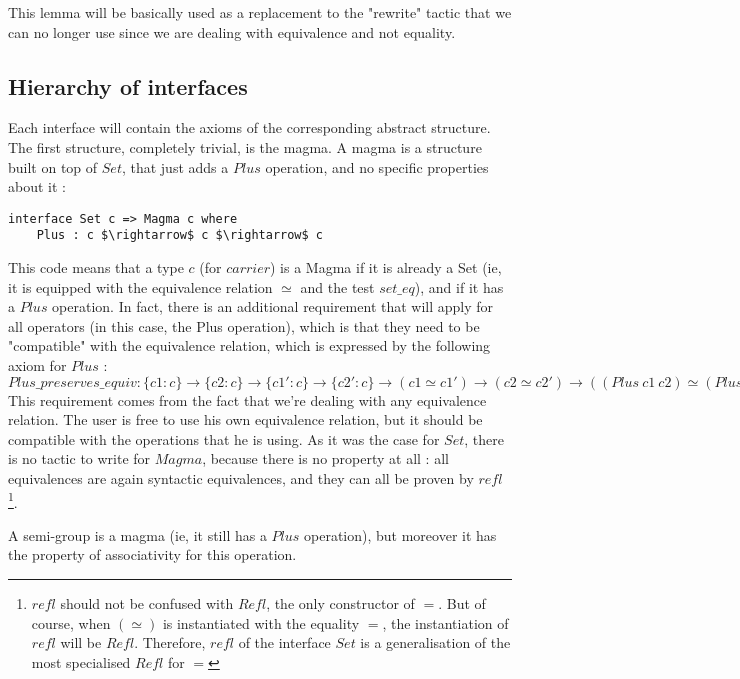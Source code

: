 This lemma will be basically used as a replacement to the "rewrite" tactic that we can no longer use since we are dealing with equivalence and not equality.

		\subsection{Hierarchy of interfaces}

Each interface will contain the axioms of the corresponding abstract structure. The first structure, completely trivial, is the magma. A magma is a structure built on top of $Set$, that just adds a $Plus$ operation, and no specific properties about it :

\begin{lstlisting}
interface Set c => Magma c where
    Plus : c $\rightarrow$ c $\rightarrow$ c
\end{lstlisting}

This code means that a type $c$ (for $carrier$) is a Magma if it is already a Set (ie, it is equipped with the equivalence relation $\simeq$ and the test $set\_eq$), and if it has a $Plus$ operation.
In fact, there is an additional requirement that will apply for all operators (in this case, the Plus operation), which is that they need to be "compatible" with the equivalence relation, which is expressed by the following axiom for $Plus$ : \\ $Plus\_preserves\_equiv : \{c1:c\} \rightarrow \{c2:c\} \rightarrow \{c1':c\} \rightarrow \{c2':c\} \rightarrow (c1 \simeq c1') \rightarrow (c2 \simeq c2') \rightarrow ((Plus\ c1\ c2) \simeq (Plus\ c1'\ c2'))$ \\ 
This requirement comes from the fact that we're dealing with any equivalence relation. The user is free to use his own equivalence relation, but it should be compatible with the operations that he is using.
As it was the case for $Set$, there is no tactic to write for $Magma$, because there is no property at all : all equivalences are again syntactic equivalences, and they can all be proven by $refl$\footnote{$refl$ should not be confused with $Refl$, the only constructor of $=$. But of course, when $(\simeq)$ is instantiated with the equality $=$, the instantiation of $refl$ will be $Refl$. Therefore, $refl$ of the interface $Set$ is a generalisation of the most specialised $Refl$ for $=$}. 

A semi-group is a magma (ie, it still has a $Plus$ operation), but moreover it has the property of associativity for this operation. 

